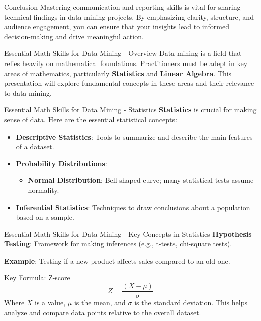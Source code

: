 \documentclass[aspectratio=169]{beamer}
\begin{document}
\begin{frame}[fragile]{Conclusion}
    Mastering communication and reporting skills is vital for sharing technical findings in data mining projects. By emphasizing clarity, structure, and audience engagement, you can ensure that your insights lead to informed decision-making and drive meaningful action.
\end{frame}

\begin{frame}[fragile]{Essential Math Skills for Data Mining - Overview}
    Data mining is a field that relies heavily on mathematical foundations. 
    Practitioners must be adept in key areas of mathematics, particularly \textbf{Statistics} and \textbf{Linear Algebra}. 
    This presentation will explore fundamental concepts in these areas and their relevance to data mining.
\end{frame}

\begin{frame}[fragile]{Essential Math Skills for Data Mining - Statistics}
    \textbf{Statistics} is crucial for making sense of data. Here are the essential statistical concepts:

    \begin{itemize}
        \item \textbf{Descriptive Statistics}: Tools to summarize and describe the main features of a dataset.
        \item \textbf{Probability Distributions}:
            \begin{itemize}
                \item \textbf{Normal Distribution}: Bell-shaped curve; many statistical tests assume normality.
            \end{itemize}
        \item \textbf{Inferential Statistics}: Techniques to draw conclusions about a population based on a sample.
    \end{itemize}
\end{frame}

\begin{frame}[fragile]{Essential Math Skills for Data Mining - Key Concepts in Statistics}
    \textbf{Hypothesis Testing}: Framework for making inferences (e.g., t-tests, chi-square tests).

    \textbf{Example}: Testing if a new product affects sales compared to an old one.

    \begin{block}{Key Formula: Z-score}
        \begin{equation}
            Z = \frac{(X - \mu)}{\sigma}
        \end{equation}
        Where \(X\) is a value, \(\mu\) is the mean, and \(\sigma\) is the standard deviation. This helps analyze and compare data points relative to the overall dataset.
    \end{block}
\end{frame}
\end{document}
